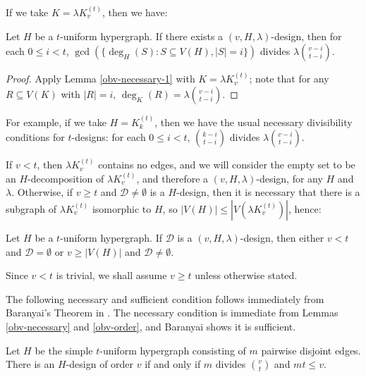 If we take $K = \lambda K_v^{(t)}$, then we have:

\begin{lemma} \label{obv-necessary}
Let $H$ be a $t$-uniform hypergraph.
If there exists a $(v, H, \lambda)$-design, then for each $0 \leq i < t$,
  $\gcd(\{ \deg_H(S) : S \subseteq V(H), |S| = i \})$ divides $\lambda {v-i \choose t-i}$.
\end{lemma}

\begin{proof}
Apply Lemma \ref{obv-necessary-1} with $K = \lambda K_v^{(t)}$;
  note that for any $R \subseteq V(K)$ with $|R| = i$, $\deg_K(R) = \lambda {v-i \choose t-i}$.
\end{proof}

For example, if we take $H = K_k^{(t)}$, then we have the usual necessary divisibility conditions for $t$-designs: for each $0 \leq i < t$, ${k-i \choose t-i}$ divides $\lambda {v-i \choose t-i}$.

If $v < t$, then $\lambda K_v^{(t)}$ contains no edges, and we will consider the empty set to be an $H$-decomposition of $\lambda K_v^{(t)}$, and therefore a $(v, H, \lambda)$-design, for any $H$ and $\lambda$. Otherwise, if $v \geq t$ and $\mathcal{D} \neq \emptyset$ is a $H$-design, then it is necessary that there is a subgraph of $\lambda K_v^{(t)}$ isomorphic to $H$, so $|V(H)| \leq |V(\lambda K_v^{(t)})|$, hence:

\begin{lemma} \label{obv-order}
Let $H$ be a $t$-uniform hypergraph. If $\mathcal{D}$ is a $(v, H, \lambda)$-design, then either $v < t$ and $\mathcal{D} = \emptyset$ or $v \geq |V(H)|$ and $\mathcal{D} \neq \emptyset$.
\end{lemma}

Since $v < t$ is trivial, we shall assume $v \geq t$ unless otherwise stated.

The following necessary and sufficient condition follows immediately from Baranyai's Theorem in \cite{baran}. The necessary condition is immediate from Lemmas \ref{obv-necessary} and \ref{obv-order}, and Baranyai shows it is sufficient.

\begin{theorem} \label{baranyai}
Let $H$ be the simple $t$-uniform hypergraph consisting of $m$ pairwise disjoint edges. There is an $H$-design of order $v$ if and only if $m$ divides ${v \choose t}$ and $mt \leq v$.
\end{theorem}
